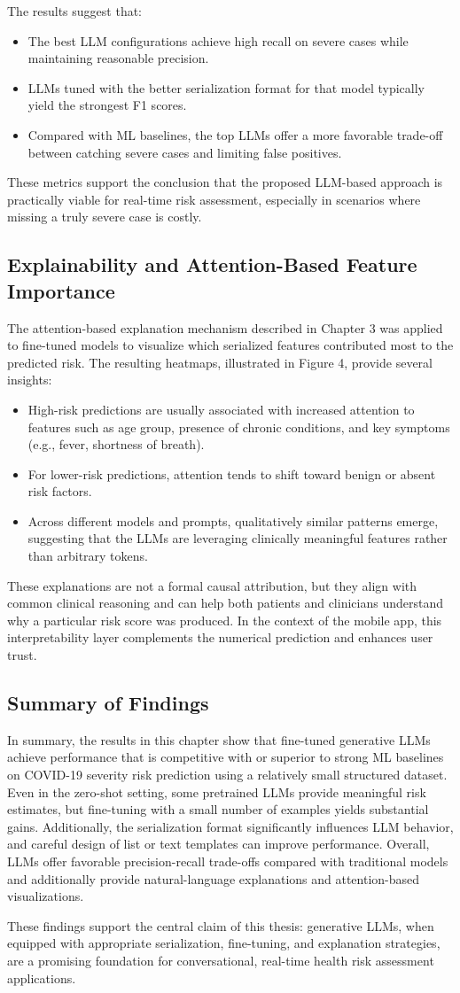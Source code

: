 The results suggest that:
\begin{itemize}
    \item The best LLM configurations achieve high recall on severe cases while maintaining reasonable precision.
    \item LLMs tuned with the better serialization format for that model typically yield the strongest F1 scores.
    \item Compared with ML baselines, the top LLMs offer a more favorable trade-off between catching severe cases and limiting false positives.
\end{itemize}
These metrics support the conclusion that the proposed LLM-based approach is practically viable for real-time risk assessment, especially in scenarios where missing a truly severe case is costly.

\subsection{Explainability and Attention-Based Feature Importance}
The attention-based explanation mechanism described in Chapter 3 was applied to fine-tuned models to visualize which serialized features contributed most to the predicted risk. The resulting heatmaps, illustrated in Figure 4, provide several insights:
\begin{itemize}
    \item High-risk predictions are usually associated with increased attention to features such as age group, presence of chronic conditions, and key symptoms (e.g., fever, shortness of breath).
    \item For lower-risk predictions, attention tends to shift toward benign or absent risk factors.
    \item Across different models and prompts, qualitatively similar patterns emerge, suggesting that the LLMs are leveraging clinically meaningful features rather than arbitrary tokens.
\end{itemize}
These explanations are not a formal causal attribution, but they align with common clinical reasoning and can help both patients and clinicians understand why a particular risk score was produced. In the context of the mobile app, this interpretability layer complements the numerical prediction and enhances user trust.

\subsection{Summary of Findings}
In summary, the results in this chapter show that fine-tuned generative LLMs achieve performance that is competitive with or superior to strong ML baselines on COVID-19 severity risk prediction using a relatively small structured dataset. Even in the zero-shot setting, some pretrained LLMs provide meaningful risk estimates, but fine-tuning with a small number of examples yields substantial gains. Additionally, the serialization format significantly influences LLM behavior, and careful design of list or text templates can improve performance. Overall, LLMs offer favorable precision-recall trade-offs compared with traditional models and additionally provide natural-language explanations and attention-based visualizations.

These findings support the central claim of this thesis: generative LLMs, when equipped with appropriate serialization, fine-tuning, and explanation strategies, are a promising foundation for conversational, real-time health risk assessment applications.
